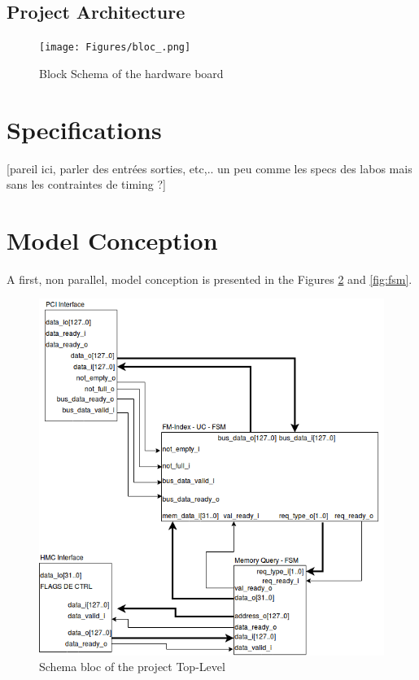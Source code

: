 \subsection{Project Architecture}

\begin{figure}[H]
    \centering
    \texttt{[image: Figures/bloc\_.png]}
    \caption{Block Schema of the hardware board}
    \label{fig:my_label}
\end{figure}

\section{Specifications}

[pareil ici, parler des entrées sorties, etc,.. un peu comme les specs des labos mais sans les contraintes de timing ?]

\section{Model Conception}

A first, non parallel, model conception is presented in the Figures \ref{fig:seqschema} and \ref{fig:fsm}.\\
\begin{figure}[H]
    \centering
    \includegraphics[scale = 0.5]{Figures/schema_bloc.png}
    \caption{Schema bloc of the project Top-Level}
    \label{fig:seqschema}
\end{figure}

